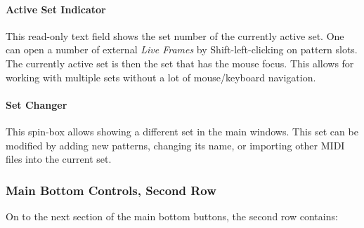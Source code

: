 \documentclass[
 11pt,
 twoside,
 a4paper,
 final                                 %
]{article}
\begin{document}
\begin{comment}


\paragraph{Set Master Button}
\label{paragraph:introduction_set_master_button}

   This button brings up an external window showing the \textbf{Set Master}
   panel.  This panel is also available in a center tab.  It is a work in
   progress, and doesn't have a whole lot of functionality yet.
   It can currently show existing sets in one view, and allow
   reordering the sets.

\end{comment}

\paragraph{Active Set Indicator}
\label{paragraph:introduction_active_set_indicator}

   This read-only text field shows the set number of the currently active set.
   One can open a number of external \textsl{Live Frames} by
   Shift-left-clicking on pattern slots.  The currently active set is then the
   set that has the mouse focus.  This allows for working with multiple sets
   without a lot of mouse/keyboard navigation.

\paragraph{Set Changer}
\label{paragraph:introduction_set_changer}

   This spin-box allows showing a different set in the main windows.
   This set can be modified by adding new patterns, changing its name, or
   importing other MIDI files into the current set.

\subsubsection{Main Bottom Controls, Second Row}
\label{subsubsec:introduction_main_bottom_controls_2}

   On to the next section of the main bottom buttons, the second row contains:
\end{document}
